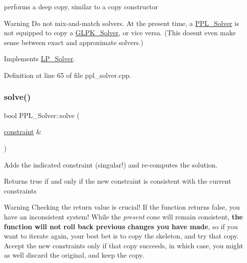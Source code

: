 performs a deep copy, similar to a copy constructor 

\begin{DoxyWarning}{Warning}
Do not mix-\/and-\/match solvers. At the present time, a \hyperlink{class_p_p_l___solver}{P\+P\+L\+\_\+\+Solver} is not equipped to copy a \hyperlink{class_g_l_p_k___solver}{G\+L\+P\+K\+\_\+\+Solver}, or vice versa. (This doesn\textquotesingle{}t even make sense between exact and approximate solvers.) 
\end{DoxyWarning}


Implements \hyperlink{class_l_p___solver_a442ad4ad67ee2feff0df49e9201d61ca}{L\+P\+\_\+\+Solver}.



Definition at line 65 of file ppl\+\_\+solver.\+cpp.

\mbox{\label{class_p_p_l___solver_a1ff16def22c734348c626b65437dd1e3}} 
\subsubsection{\texorpdfstring{solve()}{solve()}\hspace{0.1cm}{\footnotesize\ttfamily [1/2]}}
{\footnotesize\ttfamily bool P\+P\+L\+\_\+\+Solver\+::solve (\begin{DoxyParamCaption}\item[{\hyperlink{classconstraint}{constraint} \&}]{ }\end{DoxyParamCaption})\hspace{0.3cm}{\ttfamily [virtual]}}



Adds the indicated constraint (singular!) and re-\/computes the solution. 

\begin{DoxyReturn}{Returns}
{\ttfamily true} if and only if the new constraint is consistent with the current constraints
\end{DoxyReturn}
\begin{DoxyWarning}{Warning}
Checking the return value is crucial! If the function returns {\ttfamily false}, you have an inconsistent system! While the {\itshape present} cone will remain consistent, {\bfseries the function will not roll back previous changes you have made}, so if you want to iterate again, your best bet is to copy the skeleton, and try that copy. Accept the new constraints only if that copy succeeds, in which case, you might as well discard the original, and keep the copy. 
\end{DoxyWarning}


